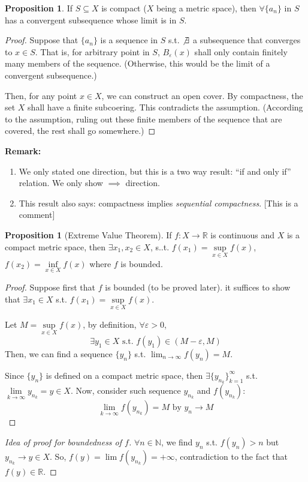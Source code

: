 \documentclass[12pt]{article}
\newcommand{\N}{{\mathbb N}}
\newcommand{\R}{{\mathbb R}}
\theoremstyle{definition}
\newtheorem{proposition}[theorem]{Proposition}
\theoremstyle{plain}
\begin{document}
\begin{proposition}
    If $S\subseteq X$ is compact ($X$ being a metric space), then $\forall
    \{a_n\}$ in $S$ has a convergent subsequence whose limit is in $S$.
    \begin{proof}
        Suppose that $\{a_n\}$ is a sequence in $S$ s.t. $\not\exists$ a subsequence that
        converges to $x \in S$.
        That is, for arbitrary point in $S$, $B_\varepsilon(x)$ shall only
        contain finitely many members of the sequence. (Otherwise, this would be
        the limit of a convergent subsequence.)

        Then, for any point $x \in X$, we can construct an open cover. By
        compactness, the set $X$ shall have a finite subcoering. This
        contradicts the assumption. (According to the assumption, ruling out
            these finite members of the sequence that are covered, the rest
        shall go somewhere.)
    \end{proof}
\end{proposition}

\textbf{Remark:}
\begin{enumerate}
    \item We only stated one direction, but this is a two way result: ``if and
        only if'' relation. We only show $\implies$ direction.

    \item This result also says: compactness implies \textit{sequential
        compactness}. [This is a comment]
\end{enumerate}

\begin{proposition}
    [Extreme Value Theorem]
    If $f: X \to \R$ is continuous and $X$ is a compact metric space, then
    $\exists x_1, x_2 \in X$, s..t. $f(x_1) = \underset{x \in X} \sup f(x)$,
    $f(x_2) = \underset{x \in X} \inf f(x)$ where $f$ is bounded.
    \begin{proof}
        Suppose first that $f$ is bounded (to be proved later). it suffices to
        show that $\exists x_1 \in X$ s.t. $f(x_1) = \underset{x \in X} \sup
        f(x)$.

        Let $M = \underset{x \in X} \sup f(x)$, by definition, $\forall
        \varepsilon > 0$,
        \[
            \exists y_1 \in X \text{ s.t. } f(y_1) \in (M - \varepsilon, M)
        \]
        Then, we can find a sequence $\{y_n\}$ s.t. $\lim_{n \to \infty} f(y_n)
        = M$.

        Since $\{ y_n \}$ is defined on a compact metric space, then $\exists \{
        y_{n_k}\}_{k=1}^\infty$ s.t. $\underset{k \to \infty} \lim y_{n_k} = y
        \in X$. Now, consider such sequence $y_{n_k}$ and $f(y_{n_k})$:
        \[
            \lim_{k \to \infty} f(y_{n_k}) = M \text{ by } y_n \to M
        \]
    \end{proof}
    \begin{proof}
        [Idea of proof for boundedness of $f$]
        $\forall n \in \N$, we find $y_n$ s.t. $f(y_n) > n$ but $y_{n_k} \to y
        \in X$. So, $f(y) = \lim f(y_{n_k}) = +\infty$, contradiction to the
        fact that $f(y) \in \R$.
    \end{proof}
\end{proposition}
\end{document}
